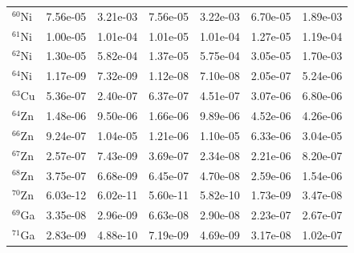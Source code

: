\begin{table}
\begin{tabular}{l|cc|cc|cc}
$^{60}$Ni & 7.56e-05 & 3.21e-03 & 7.56e-05 & 3.22e-03 & 6.70e-05 & 1.89e-03\\
$^{61}$Ni & 1.00e-05 & 1.01e-04 & 1.01e-05 & 1.01e-04 & 1.27e-05 & 1.19e-04\\
$^{62}$Ni & 1.30e-05 & 5.82e-04 & 1.37e-05 & 5.75e-04 & 3.05e-05 & 1.70e-03\\
$^{64}$Ni & 1.17e-09 & 7.32e-09 & 1.12e-08 & 7.10e-08 & 2.05e-07 & 5.24e-06\\
$^{63}$Cu & 5.36e-07 & 2.40e-07 & 6.37e-07 & 4.51e-07 & 3.07e-06 & 6.80e-06\\
$^{64}$Zn & 1.48e-06 & 9.50e-06 & 1.66e-06 & 9.89e-06 & 4.52e-06 & 4.26e-06\\
$^{66}$Zn & 9.24e-07 & 1.04e-05 & 1.21e-06 & 1.10e-05 & 6.33e-06 & 3.04e-05\\
$^{67}$Zn & 2.57e-07 & 7.43e-09 & 3.69e-07 & 2.34e-08 & 2.21e-06 & 8.20e-07\\
$^{68}$Zn & 3.75e-07 & 6.68e-09 & 6.45e-07 & 4.70e-08 & 2.59e-06 & 1.54e-06\\
$^{70}$Zn & 6.03e-12 & 6.02e-11 & 5.60e-11 & 5.82e-10 & 1.73e-09 & 3.47e-08\\
$^{69}$Ga & 3.35e-08 & 2.96e-09 & 6.63e-08 & 2.90e-08 & 2.23e-07 & 2.67e-07\\
$^{71}$Ga & 2.83e-09 & 4.88e-10 & 7.19e-09 & 4.69e-09 & 3.17e-08 & 1.02e-07\\
\hline
\end{tabular}
\end{table}
\newpage


